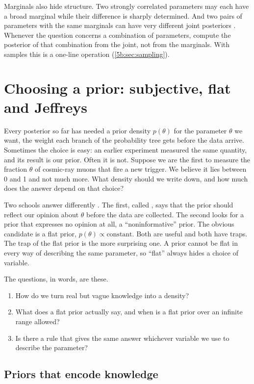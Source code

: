 Marginals also hide structure. Two strongly correlated parameters may each have a broad
marginal while their difference is sharply determined. And two pairs of parameters with
the same marginals can have very different joint posteriors
. Whenever the question concerns a combination of parameters,
compute the posterior of that combination from the joint, not from the marginals. With
samples this is a one-line operation (\cref{5b:sec:sampling}).
\section{Choosing a prior: subjective, flat and Jeffreys}
\label{5b:sec:priors}

Every posterior so far has needed a prior density $p(\theta)$ for the parameter
$\theta$ we want, the weight each branch of the probability tree gets before the data
arrive. Sometimes the choice is easy: an earlier experiment measured the same quantity,
and its result is our prior. Often it is not. Suppose we are the first to measure the
fraction $\theta$ of cosmic-ray muons that fire a new trigger. We believe it lies
between 0 and 1 and not much more. What density should we write down, and how much
does the answer depend on that choice?

Two schools answer differently . The first, called
, says that the prior should reflect our opinion about $\theta$
before the data are collected. The second looks for a prior that expresses no opinion
at all, a ``noninformative'' prior. The obvious candidate is a flat prior,
$p(\theta)\propto\text{constant}$. Both are useful and both have traps. The trap of the
flat prior is the more surprising one. A prior cannot be flat in every way of describing
the same parameter, so ``flat'' always hides a choice of variable.

The questions, in words, are these.
\begin{enumerate}
  \item How do we turn real but vague knowledge into a density?
  \item What does a flat prior actually say, and when is a flat prior over an infinite
        range allowed?
  \item Is there a rule that gives the same answer whichever variable we use to
        describe the parameter?
\end{enumerate}

\subsection{Priors that encode knowledge}

